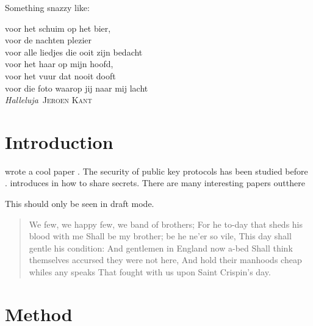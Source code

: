\cleardoublepage{}

\begin{dedication}
Something snazzy like:
\vspace{3em}

voor het schuim op het bier,\\
voor de nachten plezier\\
voor alle liedjes die ooit zijn bedacht\\
voor het haar op mijn hoofd,\\
voor het vuur dat nooit dooft\\
voor die foto waarop jij naar mij lacht\\
\textit{Halleluja}~\textsc{Jeroen Kant}
\vfill
\end{dedication}

\tableofcontents

\mainmatter{}

\chapter{Introduction}
\nocite{*}
\citeauthor{Shannon1946} wrote a cool paper \citep{Shannon1946}. The security of public key protocols has been studied before \citep{Dolev1983}. \citeauthor{Shamir1979} introduces in \citet{Shamir1979} how to share secrets.
There are many interesting papers outthere \citet{Needham1978,Rivest1978,Merkle1978,Diffie1976,Shannon1949,Ziv1977, Huffman1952, Hamming1950}

\begin{fncycomment}
This should only be seen in draft mode.
\end{fncycomment}

\begin{quote}
We few, we happy few, we band of brothers;
For he to-day that sheds his blood with me
Shall be my brother; be he ne'er so vile,
This day shall gentle his condition:
And gentlemen in England now a-bed
Shall think themselves accursed they were not here,
And hold their manhoods cheap whiles any speaks
That fought with us upon Saint Crispin's day.
\end{quote}

\lipsum{}

\chapter{Method}

